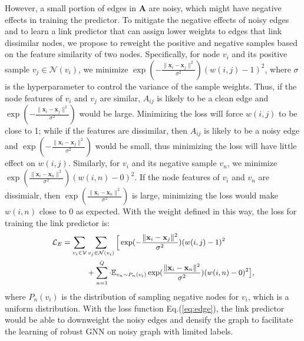 However, a small portion of edges in $\mathbf{A}$ are noisy, which might have negative effects in training the predictor. To mitigate the negative effects of noisy edges and to learn a link predictor that can assign lower weights to edges that link dissimilar nodes, we propose to reweight the positive and negative samples based on the feature similarity of two nodes. Specifically, for node  $v_i$ and its positive sample $v_j \in \mathcal{N}(v_i)$, we minimize $\exp(-\frac{\|\mathbf{x}_i-\mathbf{x}_j\|^2}{\sigma^2}) (w(i,j)-1)^2$, where $\sigma$ is the hyperparameter to control the variance of the sample weights. Thus, if the node features of $v_i$ and $v_j$ are similar, $A_{ij}$ is likely to be a clean edge and $\exp(-\frac{\|\mathbf{x}_i-\mathbf{x}_j\|^2}{\sigma^2})$ would be large. Minimizing the loss will force $w(i,j)$ to be close to 1; while if the features are dissimilar, then $A_{ij}$ is likely to be a noisy edge and $\exp(-\frac{\|\mathbf{x}_i-\mathbf{x}_j\|^2}{\sigma^2})$ would be small, thus minimizing the loss will have little effect on $w(i,j)$. Similarly, for $v_i$ and its negative sample $v_n$, we minimize $\exp(\frac{\|\mathbf{x}_i-\mathbf{x}_n\|^2}{\sigma^2}) (w(i,n)-0)^2$. If the node features of $v_i$ and $v_n$ are dissimialr, then $\exp(\frac{\|\mathbf{x}_i-\mathbf{x}_n\|^2}{\sigma^2})$ is large, minimizing the loss would make $w(i,n)$ close to 0 as expected. With the weight defined in this way, the loss for training the link predictor is:
\begin{equation}
\small
\begin{aligned}
    \mathcal{L}_E = \sum_{v_i \in \mathcal{V}} & \sum_{v_j \in \mathcal{N}(v_i)} \Big[\exp(-\frac{\|\mathbf{x}_i-\mathbf{x}_j\|^2}{\sigma^2}) (w(i,j)-1)^2 \\
    & +   \sum_{n=1}^{Q} \cdot \mathbb{E}_{v_n \sim P_n(v_i)} \exp(\frac{\|\mathbf{x}_i-\mathbf{x}_n\|^2}{\sigma^2}) (w(i,n)-0)^2\big],
    \label{eq:edge}
\end{aligned}
\end{equation}
where $P_n(v_i)$ is the distribution of sampling negative nodes for $v_i$, which is a uniform distribution. With the loss function Eq.(\ref{eq:edge}), the link predictor would be able to downweight the noisy edges and densify the graph to facilitate the learning of robust GNN on noisy graph with limited labels. 

